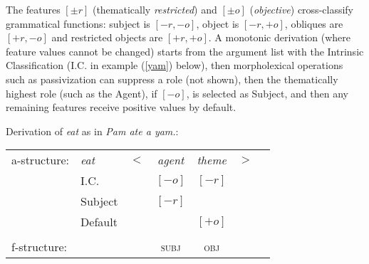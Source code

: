 \begin{sloppypar}
\noindent  
The features $[\pm r]$ (thematically \textit{restricted}) and $[\pm o]$ (\textit{objective}) cross-classify grammatical functions: subject is $[-r, -o]$, object is $[-r, +o]$, obliques are $[+r, -o]$ and
restricted objects are $[+r, +o]$.   A monotonic derivation (where feature values cannot be changed) starts from the argument list with the Intrinsic Classification (I.C. in example  (\ref{yam}) below), then morpholexical operations such as passivization can suppress a role (not shown), then the thematically highest role (such as the Agent), if $[-o]$, is selected as Subject, %
and then any remaining features receive positive values by default.
\end{sloppypar}

 \begin{exe}
\ex\label{yam}{Derivation of \textit{eat} as in \textit{Pam ate a yam.}:\\
\begin{tabular}[t]{@{}lllccll}
a-structure: &\textit{eat}& $<$& \textit{agent} & \textit{theme}   & $>$ & \\
             & I.C.      &    & $[-o]$ & $[-r]$   &   & \\
             &  Subject     &    & $[-r]$ &            &              & \\
             &  Default     &    &     & $[+o]$   &   & \\
             &       &    &\vline    & \vline &    & \\
f-structure: &       &    &\textsc{subj} &\textsc{obj}  &   &
\end{tabular}
  }
\end{exe}

